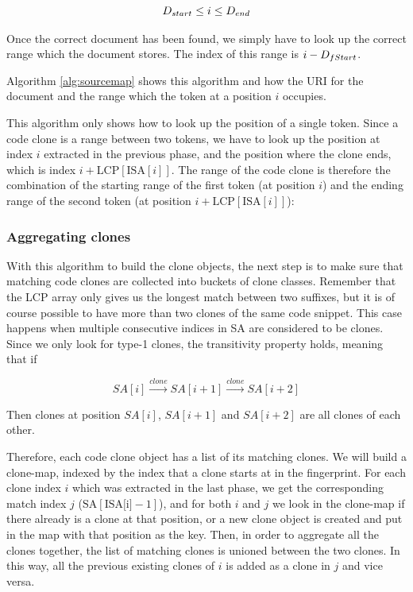 $$
{{D}_{start}} \leq i \leq {{D}_{end}}
$$

Once the correct document has been found, we simply have to look up the correct range
which the document stores. The index of this range is $i -
{{D}_{fStart}}$.

Algorithm \ref{alg:sourcemap} shows this algorithm and how the URI for the document and
the range which the token at a position $i$ occupies.

This algorithm only shows how to look up the position of a single token. Since a code
clone is a range between two tokens, we have to look up the position at index $i$
extracted in the previous phase, and the position where the clone ends, which is index $i
+ \text{LCP}[\text{ISA}[i]]$. The range of the code clone is therefore the combination of
the starting range of the first token (at position $i$) and the ending range of the second
token (at position $i + \text{LCP}[\text{ISA}[i]]$):

\subsubsection{Aggregating clones}

With this algorithm to build the clone objects, the next step is to make sure that
matching code clones are collected into buckets of clone classes. Remember that the LCP
array only gives us the longest match between two suffixes, but it is of course possible
to have more than two clones of the same code snippet. This case happens when multiple
consecutive indices in SA are considered to be clones. Since we only look for type-1
clones, the transitivity property holds, meaning that if

$$
SA[i] \xrightarrow{clone} SA[i+1] \xrightarrow{clone} SA[i + 2]
$$

Then clones at position $SA[i]$, $SA[i+1]$ and $SA[i + 2]$ are all clones of each other.

Therefore, each code clone object has a list of its matching clones. We will build a
clone-map, indexed by the index that a clone starts at in the fingerprint. For each clone
index $i$ which was extracted in the last phase, we get the corresponding match index $j$
($\text{SA}[\text{ISA[i]} - 1]$), and for both $i$ and $j$ we look in the clone-map if
there already is a clone at that position, or a new clone object is created and put in the
map with that position as the key. Then, in order to aggregate all the clones together,
the list of matching clones is unioned between the two clones. In this way, all the
previous existing clones of $i$ is added as a clone in $j$ and vice versa.


